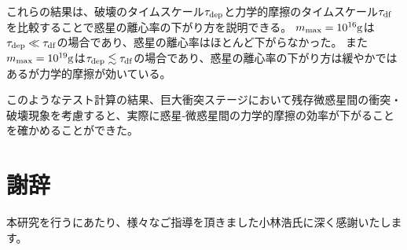 \documentclass[a4paper,10pt,oneside,twocolumn,notitlepage,final]{jarticle}
\begin{document}
これらの結果は、破壊のタイムスケール$\tau_{\rm dep}$と力学的摩擦のタイムスケール$\tau_{\rm df}$を比較することで惑星の離心率の下がり方を説明できる。
$m_{\rm max}=10^{16} \rm g$は$\tau_{\rm dep} \ll \tau_{\rm df}$の場合であり、惑星の離心率はほとんど下がらなかった。
また$m_{\rm max}=10^{19} \rm g$は$\tau_{\rm dep} \lesssim \tau_{\rm df}$の場合であり、惑星の離心率の下がり方は緩やかではあるが力学的摩擦が効いている。
\par
このようなテスト計算の結果、巨大衝突ステージにおいて残存微惑星間の衝突・破壊現象を考慮すると、実際に惑星-微惑星間の力学的摩擦の効率が下がることを確かめることができた。







\section*{謝辞}

本研究を行うにあたり、様々なご指導を頂きました小林浩氏に深く感謝いたします。

\small


\end{document}
